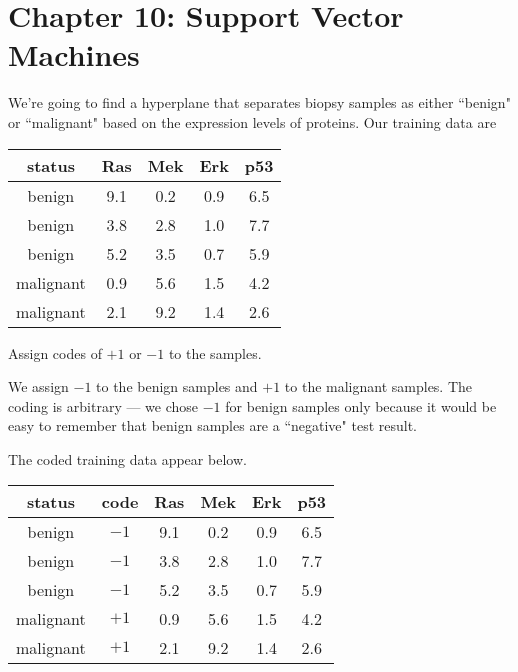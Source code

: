 \documentclass[12pt]{pajarticle}
\begin{document}

\section*{Chapter 10: Support Vector Machines}

We're going to find a hyperplane that separates biopsy samples as either ``benign" or ``malignant" based on the expression levels of proteins. Our training data are


\begin{center}
\begin{tabular}{c|cccc}
status    & Ras & Mek & Erk & p53 \\
\hline
benign    & 9.1 & 0.2 & 0.9 & 6.5 \\
benign    & 3.8 & 2.8 & 1.0 & 7.7 \\
benign    & 5.2 & 3.5 & 0.7 & 5.9 \\
malignant & 0.9 & 5.6 & 1.5 & 4.2 \\
malignant & 2.1 & 9.2 & 1.4 & 2.6
\end{tabular}
\end{center}

\begin{question}{1}{Assign codes of $+1$ or $-1$ to the samples.}{
We assign $-1$ to the benign samples and $+1$ to the malignant samples. The coding is arbitrary --- we chose $-1$ for benign samples only because it would be easy to remember that benign samples are a ``negative" test result.

The coded training data appear below.

\begin{center}
\begin{tabular}{cc|cccc}
status    & code & Ras & Mek & Erk & p53 \\
\hline
benign    & $-1$ & 9.1 & 0.2 & 0.9 & 6.5 \\
benign    & $-1$ & 3.8 & 2.8 & 1.0 & 7.7 \\
benign    & $-1$ & 5.2 & 3.5 & 0.7 & 5.9 \\
malignant & $+1$ & 0.9 & 5.6 & 1.5 & 4.2 \\
malignant & $+1$ & 2.1 & 9.2 & 1.4 & 2.6
\end{tabular}
\end{center}

}
\end{question}
\end{document}
